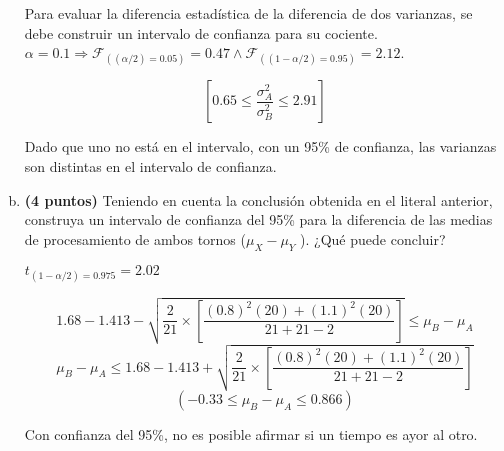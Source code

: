 \documentclass[../main.tex]{subfiles}
\begin{document}
\begin{enumerate}[(a)]
Para evaluar la diferencia estadística de la diferencia de dos varianzas, se debe construir un intervalo de confianza para su cociente. $\alpha = 0.1 \Rightarrow \mathcal{F}_{((\alpha / 2) = 0.05)} = 0.47 \wedge \mathcal{F}_{((1 - \alpha / 2) = 0.95)} = 2.12 $.

$$\left[ 0.65 \leq \frac{\sigma_A ^2}{\sigma_B ^2} \leq 2.91 \right]$$

Dado que uno no está en el intervalo, con un 95\% de confianza, las varianzas son distintas en el intervalo de confianza.  

\item \textbf{(4 puntos)} Teniendo en cuenta la conclusión obtenida en el literal anterior, construya un intervalo de confianza del 95\% para la diferencia de las medias de procesamiento de ambos tornos ($\mu_X - \mu_Y$ ). ¿Qué puede concluir?

$t_{(1- \alpha / 2) = 0.975} = 2.02$

$$1.68 - 1.413 - \sqrt{\frac{2}{21} \times \left[ \frac{(0.8)^2(20)+(1.1)^2(20)}{21 + 21 - 2}\right]} \leq \mu_B - \mu_A$$
$$\mu_B - \mu_A \leq 1.68 - 1.413 + \sqrt{\frac{2}{21} \times \left[ \frac{(0.8)^2(20)+(1.1)^2(20)}{21 + 21 - 2}\right]} $$
$$(-0.33 \leq \mu_B - \mu_A \leq 0.866)$$

Con confianza del 95\%, no es posible afirmar si un tiempo es ayor al otro.
\end{enumerate}
\end{document}
